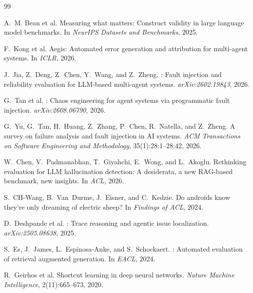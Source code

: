 \documentclass{article}
\begin{document}
\clearpage

\begin{thebibliography}{99}
\small

A.~M. Bean et al.
\newblock Measuring what matters: Construct validity in large language model benchmarks.
\newblock In \emph{NeurIPS Datasets and Benchmarks}, 2025.

F.~Kong et al.
\newblock Aegis: Automated error generation and attribution for multi-agent systems.
\newblock In \emph{ICLR}, 2026.

J.~Jia, Z.~Deng, Z.~Chen, Y.~Wang, and Z.~Zheng.
: Fault injection and reliability evaluation for {LLM}-based multi-agent systems.
\newblock \emph{arXiv:2602.19843}, 2026.

G.~Tan et al.
: Chaos engineering for agent systems via programmatic fault injection.
\newblock \emph{arXiv:2608.06790}, 2026.

G.~Yu, G.~Tan, H.~Huang, Z.~Zhang, P.~Chen, R.~Natella, and Z.~Zheng.
\newblock A survey on failure analysis and fault injection in {AI} systems.
\newblock \emph{ACM Transactions on Software Engineering and Methodology}, 35(1):28:1--28:42,
2026.

W.~Chen, V.~Padmanabhan, T.~Giyahchi, E.~Wong, and L.~Akoglu.
\newblock Rethinking evaluation for {LLM} hallucination detection: A desiderata, a new {RAG}-based benchmark, new insights.
\newblock In \emph{ACL}, 2026.

S.~CH-Wang, B.~Van~Durme, J.~Eisner, and C.~Kedzie.
\newblock Do androids know they're only dreaming of electric sheep?
\newblock In \emph{Findings of ACL}, 2024.

D.~Deshpande et al.
: Trace reasoning and agentic issue localization.
\newblock \emph{arXiv:2505.08638}, 2025.

S.~Es, J.~James, L.~Espinosa-Anke, and S.~Schockaert.
: Automated evaluation of retrieval augmented generation.
\newblock In \emph{EACL}, 2024.

R.~Geirhos et al.
\newblock Shortcut learning in deep neural networks.
\newblock \emph{Nature Machine Intelligence}, 2(11):665--673, 2020.


\end{thebibliography}
\end{document}
